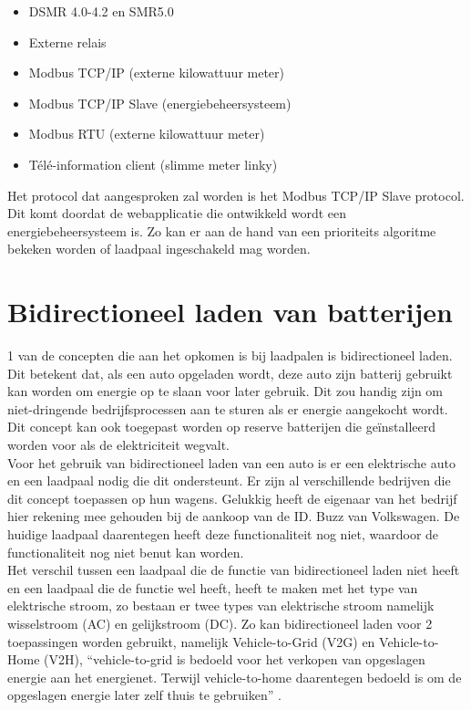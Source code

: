 \begin{itemize}
    \item DSMR 4.0-4.2 en SMR5.0
    \item Externe relais
    \item Modbus TCP/IP (externe kilowattuur meter)
    \item Modbus TCP/IP Slave (energiebeheersysteem)
    \item Modbus RTU (externe kilowattuur meter)
    \item Télé-information client (slimme meter linky)
\end{itemize}

Het protocol dat aangesproken zal worden is het Modbus TCP/IP Slave protocol. Dit komt doordat de webapplicatie die ontwikkeld wordt een energiebeheersysteem is. Zo kan er aan de hand van een prioriteits algoritme bekeken worden of laadpaal ingeschakeld mag worden.


\section{Bidirectioneel laden van batterijen}
\label{sec:stand-van-zaken-bidirectioneel-laden}

1 van de concepten die aan het opkomen is bij laadpalen is bidirectioneel laden. Dit betekent dat, als een auto opgeladen wordt, deze auto zijn batterij gebruikt kan worden om energie op te slaan voor later gebruik. Dit zou handig zijn om niet-dringende bedrijfsprocessen aan te sturen als er energie aangekocht wordt. Dit concept kan ook toegepast worden op reserve batterijen die geïnstalleerd worden voor als de elektriciteit wegvalt.\\

Voor het gebruik van bidirectioneel laden van een auto is er een elektrische auto en een laadpaal nodig die dit ondersteunt. Er zijn al verschillende bedrijven die dit concept toepassen op hun wagens. Gelukkig heeft de eigenaar van het bedrijf hier rekening mee gehouden bij de aankoop van de ID. Buzz van Volkswagen. De huidige laadpaal daarentegen heeft deze functionaliteit nog niet, waardoor de functionaliteit nog niet benut kan worden.\\

Het verschil tussen een laadpaal die de functie van bidirectioneel laden niet heeft en een laadpaal die de functie wel heeft, heeft te maken met het type van elektrische stroom, zo bestaan er twee types van elektrische stroom namelijk wisselstroom (AC) en gelijkstroom (DC). Zo kan bidirectioneel laden voor 2 toepassingen worden gebruikt, namelijk Vehicle-to-Grid (V2G) en Vehicle-to-Home (V2H), “vehicle-to-grid is bedoeld voor het verkopen van opgeslagen energie aan het energienet. Terwijl vehicle-to-home daarentegen bedoeld is om de opgeslagen energie later zelf thuis te gebruiken” \autocite{LAZZERONI2019}.\\

